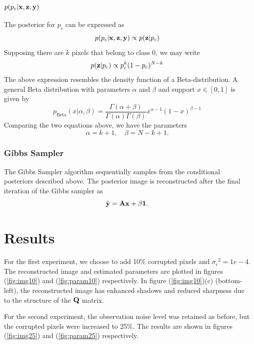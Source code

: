 \documentclass[a4paper,10pt]{article}
\def\bA{{\bf A}}
\def\bQ{{\bf Q}}
\def\bx{{\bf x}}
\def\by{{\bf y}}
\def\bz{{\bf z}}
\def\sigmaeps{{\sigma_{\epsilon}}}
\begin{document}
\subsubsection{$p(p_c | \bx, \bz, \by)$}
The posterior for $p_c$ can be expressed as
\begin{equation}
 p(p_c | \bx, \bz, \by) \propto p(\bz | p_c)
\end{equation}
Supposing there are $k$ pixels that belong to class 0, we may write
\begin{equation}
 p(\bz | p_c) \propto p_c^k (1 - p_c)^{N-k}
\end{equation}
The above expression resembles the density function of a Beta-distribution. A general Beta distribution with parameters $\alpha$ and $\beta$ and support $x \in [0,1]$ is given by
\begin{equation}
 p_{\mathrm{Beta}}(x|\alpha,\beta) = \frac{\Gamma(\alpha+\beta)}{\Gamma(\alpha) \Gamma(\beta)} x^{\alpha-1} (1-x)^{\beta-1}
\end{equation}
Comparing the two equations above, we have the parameters
\begin{equation}
 \alpha = k + 1, \quad \beta = N-k+1.
\end{equation}

\subsubsection{Gibbs Sampler}
The Gibbs Sampler algorithm sequentially samples from the conditional posteriors described above. The posterior image is reconstructed after the final iteration of the Gibbs sampler as
\begin{equation}
 \hat \by = \bA \bx + \beta \mathbf{1}.
\end{equation}

\section{Results}
For the first experiment, we choose to add 10\% corrupted pixels and $\sigmaeps^2 = 1e-4$. The reconstructed image and estimated parameters are plotted in figures (\ref{fig:img10}) and (\ref{fig:param10}) respectively. In figure (\ref{fig:img10})(c) (bottom-left), the reconstructed image has enhanced shadows and reduced sharpness due to the structure of the $\bQ$ matrix.

For the second experiment, the observation noise level was retained as before, but the corrupted pixels were increased to 25\%. The results are shown in figures (\ref{fig:img25}) and (\ref{fig:param25}) respectively.
\end{document}

